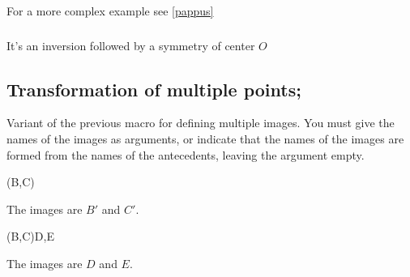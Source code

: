 For a more complex example see  \ref{pappus}

\subsubsection{}
It's an inversion followed by a symmetry of center $O$
\begin{tkzexample}[latex=5cm,small]  
\end{tkzexample} 


\newpage
\subsection{Transformation of multiple points;  }
Variant of the previous macro for defining multiple images.
You must give the names of the images as arguments, or indicate that the names of the images are formed from the names of the antecedents, leaving the argument empty. 

\begin{tkzltxexample}[]
\tkzDefPointsBy[translation= from A to A'](B,C){}
\end{tkzltxexample}
The images are $B'$ and $C'$.

\begin{tkzltxexample}[]
\tkzDefPointsBy[translation= from A to A'](B,C){D,E} 
\end{tkzltxexample}
The images are $D$ and $E$.

